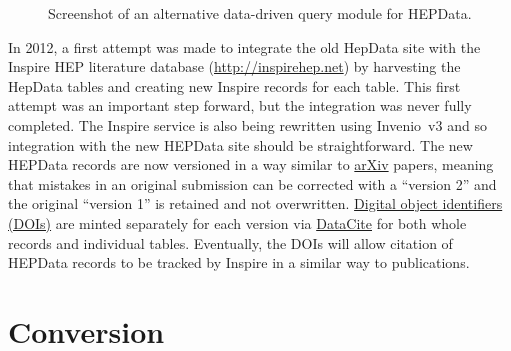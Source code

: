 \documentclass[a4paper]{jpconf}
\begin{document}
\begin{figure}
  \begin{center}
  \end{center}
  \caption{\label{fig:explore}Screenshot of an alternative data-driven query
module for HEPData.}
\end{figure}

In 2012, a first attempt was made to integrate the old HepData site with the
Inspire HEP literature database (\url{http://inspirehep.net}) by harvesting the
HepData tables and creating new Inspire records for each table.  This first
attempt was an important step forward, but the integration was never fully
completed.  The Inspire service is also being rewritten using Invenio~v3 and so
integration with the new HEPData site should be straightforward.  The new
HEPData records are now versioned in a way similar to
\href{https://arxiv.org/}{arXiv} papers, meaning that mistakes in an original
submission can be corrected with a ``version 2'' and the original ``version 1''
is retained and not overwritten.  \href{https://www.doi.org}{Digital object
identifiers (DOIs)} are minted separately for each version via
\href{https://www.datacite.org}{DataCite} for both whole records and
individual tables.  Eventually, the DOIs will allow citation of HEPData
records to be tracked by Inspire in a similar way to publications.

\section{Conversion} \label{sec:conversion}
\end{document}
